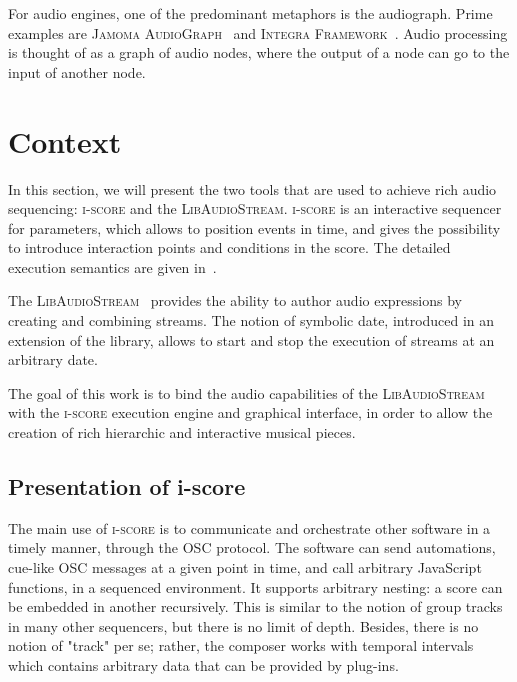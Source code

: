 \documentclass{article}
\newcommand*{\LibAudioStream}{\textsc{LibAudioStream}\xspace}
\newcommand*{\iscore}{\textsc{i-score}\xspace}
\newcommand*{\jamomaaudiograph}{\textsc{Jamoma AudioGraph}\xspace}
\newcommand*{\integraframework}{\textsc{Integra Framework}\xspace}
\begin{document}
For audio engines, one of the predominant metaphors is the audiograph.
Prime examples are \jamomaaudiograph~\cite{place2010jamoma} and \integraframework~\cite{bullock2011integra}.
Audio processing is thought of as a graph of audio nodes, where the output of a node can go to the input of another node.

\section{Context}
In this section, we will present the two tools that are used to achieve 
rich audio sequencing: \iscore and the \LibAudioStream.
\iscore is an interactive sequencer for parameters, which allows to position events 
in time, and gives the possibility to introduce interaction points and 
conditions in the score.
The detailed execution semantics are given in~\cite{celerier2015ossia}.

The \LibAudioStream~\cite{letzlibaudiostream} provides the ability to author audio expressions
by creating and combining streams. The notion of symbolic date, introduced in an extension of the library,
allows to start and stop the execution of streams at an arbitrary date.

The goal of this work is to bind the audio capabilities of the \LibAudioStream 
with the \iscore execution engine and graphical interface, in order to allow 
the creation of rich hierarchic and interactive musical pieces.

\subsection{Presentation of i-score}
The main use of \iscore is to communicate and orchestrate other software in a timely manner, 
through the OSC protocol.
The software can send automations, cue-like OSC messages at a given point in time, and call arbitrary JavaScript functions, in a sequenced environment.
It supports arbitrary nesting: a score can be embedded in another recursively.
This is similar to the notion of group tracks in many other sequencers, but 
there is no limit of depth. 
Besides, there is no notion of "track" per se; rather, the composer works with 
temporal intervals which contains arbitrary data that can be provided by plug-ins.
\end{document}
